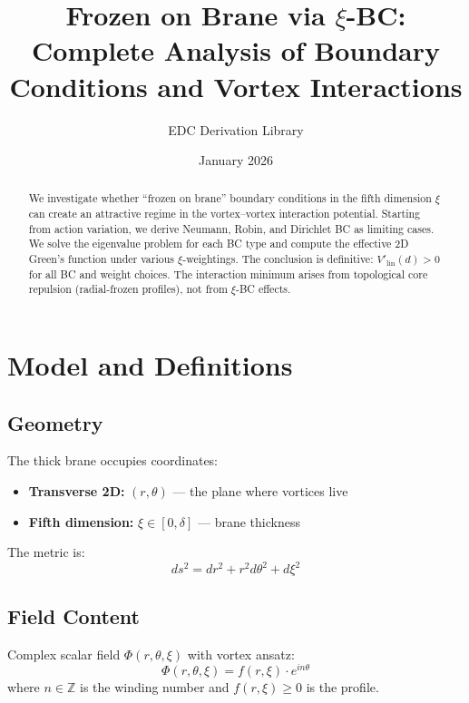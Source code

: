 \documentclass[11pt,a4paper]{article}
\title{Frozen on Brane via $\xi$-BC:\\Complete Analysis of Boundary Conditions and Vortex Interactions}
\author{EDC Derivation Library}
\date{January 2026}
\begin{document}
\maketitle

\begin{abstract}
We investigate whether ``frozen on brane'' boundary conditions in the fifth dimension $\xi$
can create an attractive regime in the vortex--vortex interaction potential. Starting from
action variation, we derive Neumann, Robin, and Dirichlet BC as limiting cases. We solve
the eigenvalue problem for each BC type and compute the effective 2D Green's function
under various $\xi$-weightings. The conclusion is definitive: $V'_{\mathrm{lin}}(d) > 0$
for all BC and weight choices. The interaction minimum arises from topological core
repulsion (radial-frozen profiles), not from $\xi$-BC effects.
\end{abstract}

\tableofcontents
\newpage

\section{Model and Definitions}
\label{sec:model}

\subsection{Geometry}

The thick brane occupies coordinates:
\begin{itemize}[nosep]
    \item \textbf{Transverse 2D:} $(r, \theta)$ --- the plane where vortices live
    \item \textbf{Fifth dimension:} $\xi \in [0, \delta]$ --- brane thickness
\end{itemize}

The metric is:
\begin{equation}
ds^2 = dr^2 + r^2 d\theta^2 + d\xi^2
\end{equation}

\subsection{Field Content}

Complex scalar field $\Phi(r, \theta, \xi)$ with vortex ansatz:
\begin{equation}
\Phi(r, \theta, \xi) = f(r, \xi) \cdot e^{in\theta}
\end{equation}
where $n \in \mathbb{Z}$ is the winding number and $f(r, \xi) \geq 0$ is the profile.
\end{document}
